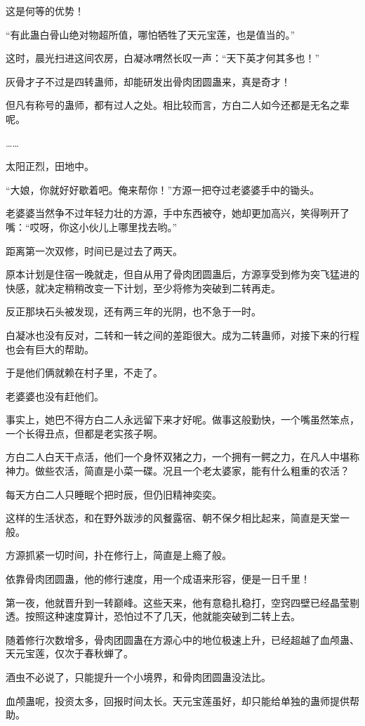 \begin{this_body}
这是何等的优势！

“有此蛊白骨山绝对物超所值，哪怕牺牲了天元宝莲，也是值当的。”

这时，晨光扫进这间农房，白凝冰喟然长叹一声：“天下英才何其多也！”

灰骨才子不过是四转蛊师，却能研发出骨肉团圆蛊来，真是奇才！

但凡有称号的蛊师，都有过人之处。相比较而言，方白二人如今还都是无名之辈呢。

……

太阳正烈，田地中。

“大娘，你就好好歇着吧。俺来帮你！”方源一把夺过老婆婆手中的锄头。

老婆婆当然争不过年轻力壮的方源，手中东西被夺，她却更加高兴，笑得咧开了嘴：“哎呀，你这小伙儿上哪里找去哟。”

距离第一次双修，时间已是过去了两天。

原本计划是住宿一晚就走，但自从用了骨肉团圆蛊后，方源享受到修为突飞猛进的快感，就决定稍稍改变一下计划，至少将修为突破到二转再走。

反正那块石头被发现，还有两三年的光阴，也不急于一时。

白凝冰也没有反对，二转和一转之间的差距很大。成为二转蛊师，对接下来的行程也会有巨大的帮助。

于是他们俩就赖在村子里，不走了。

老婆婆也没有赶他们。

事实上，她巴不得方白二人永远留下来才好呢。做事这般勤快，一个嘴虽然笨点，一个长得丑点，但都是老实孩子啊。

方白二人白天干点活，他们一个身怀双猪之力，一个拥有一鳄之力，在凡人中堪称神力。做些农活，简直是小菜一碟。况且一个老太婆家，能有什么粗重的农活？

每天方白二人只睡眠个把时辰，但仍旧精神奕奕。

这样的生活状态，和在野外跋涉的风餐露宿、朝不保夕相比起来，简直是天堂一般。

方源抓紧一切时间，扑在修行上，简直是上瘾了般。

依靠骨肉团圆蛊，他的修行速度，用一个成语来形容，便是一日千里！

第一夜，他就晋升到一转巅峰。这些天来，他有意稳扎稳打，空窍四壁已经晶莹剔透。按照这种速度算计，恐怕过不了几天，他就能突破到二转上去。

随着修行次数增多，骨肉团圆蛊在方源心中的地位极速上升，已经超越了血颅蛊、天元宝莲，仅次于春秋蝉了。

酒虫不必说了，只能提升一个小境界，和骨肉团圆蛊没法比。

血颅蛊呢，投资太多，回报时间太长。天元宝莲虽好，却只能给单独的蛊师提供帮助。


\end{this_body}
